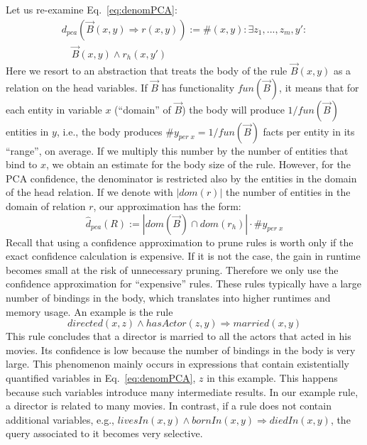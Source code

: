 {Let us re-examine Eq.~\ref{eq:denomPCA}:
\[
\begin{array}{rl}
 d_{pca}(\vec{B}(x,y) \Rightarrow r(x,y)) := {} \#(x,y): \exists z_1,...,z_m,y': \\ \quad \vec{B}(x, y) \wedge r_h(x,y')
\end{array}
\]
Here we resort to an abstraction that treats the body of the rule $\vec{B}(x, y)$ as a relation
on the head variables. If $\vec{B}$ has functionality $fun(\vec{B})$, it means that for each entity in variable $x$ (``domain'' of $\vec{B}$) the body will produce $1/fun(\vec{B})$ entities in $y$,
i.e., the body produces $\#y_{per\; x} = 1/fun(\vec{B})$ facts per entity in its ``range'', on average. If we multiply this number
by the number of entities that bind to $x$,
we obtain an estimate for the body size of the rule. However, for the PCA confidence, the denominator is restricted also by the entities in the domain of the head relation.
If we denote with $|dom(r)|$ the number of entities in the domain of relation $r$, our approximation has the form:
\begin{equation} \label{eq:pcaApproxConf_general}
  \widehat{d}_{pca}(R):=|dom(\vec{B}) \cap dom(r_h)|\cdot \#y_{per\; x}
\end{equation}
Recall that using a confidence approximation to prune rules is worth only if
the exact confidence calculation is expensive.
If it is not the case, the gain in runtime becomes small at the risk of unnecessary pruning.
Therefore we only use the confidence approximation for ``expensive'' rules.
These rules typically have a large number of bindings in the body, which translates into
higher runtimes and memory usage. An example is the rule
\[
 directed(x,z) \wedge hasActor(z,y) \Rightarrow married(x,y)
\]
This rule concludes that a director is married to all the actors that acted in his movies. Its
confidence is low because the number of bindings in the body is very large.
This phenomenon mainly occurs in expressions that contain existentially quantified variables in Eq.~\ref{eq:denomPCA},
$z$ in this example. This happens because such variables introduce many intermediate results. In our example
rule, a director is related to many movies. In contrast, if a rule does not contain additional variables,
e.g., $livesIn(x,y)\wedge bornIn(x,y)\Rightarrow diedIn(x,y)$, the query associated to it becomes very selective.

}
